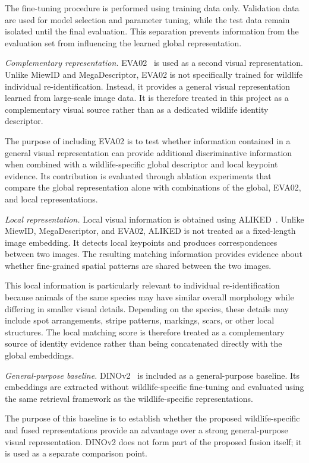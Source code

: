 \documentclass[runningheads]{llncs}
\begin{document}
The fine-tuning procedure is performed using training data only. Validation data are used for model
selection and parameter tuning, while the test data remain isolated until the final evaluation.
This separation prevents information from the evaluation set from influencing the learned global
representation.

\emph{Complementary representation.}
EVA02~\cite{fang2023eva02} is used as a second visual representation. Unlike MiewID and
MegaDescriptor, EVA02 is not specifically trained for wildlife individual re-identification.
Instead, it provides a general visual representation learned from large-scale image data. It is
therefore treated in this project as a complementary visual source rather than as a dedicated
wildlife identity descriptor.

The purpose of including EVA02 is to test whether information contained in a general visual
representation can provide additional discriminative information when combined with a
wildlife-specific global descriptor and local keypoint evidence. Its contribution is evaluated
through ablation experiments that compare the global representation alone with combinations of the
global, EVA02, and local representations.

\emph{Local representation.}
Local visual information is obtained using ALIKED~\cite{zhao2023aliked}. Unlike MiewID, MegaDescriptor,
and EVA02, ALIKED is not treated as a fixed-length image embedding. It detects local keypoints and
produces correspondences between two images. The resulting matching information provides evidence
about whether fine-grained spatial patterns are shared between the two images.

This local information is particularly relevant to individual re-identification because animals of
the same species may have similar overall morphology while differing in smaller visual details.
Depending on the species, these details may include spot arrangements, stripe patterns, markings,
scars, or other local structures. The local matching score is therefore treated as a complementary
source of identity evidence rather than being concatenated directly with the global embeddings.

\emph{General-purpose baseline.}
DINOv2~\cite{oquab2023dinov2} is included as a general-purpose baseline. Its embeddings are extracted
without wildlife-specific fine-tuning and evaluated using the same retrieval framework as the
wildlife-specific representations.

The purpose of this baseline is to establish whether the proposed wildlife-specific and fused
representations provide an advantage over a strong general-purpose visual representation. DINOv2
does not form part of the proposed fusion itself; it is used as a separate comparison point.
\end{document}
